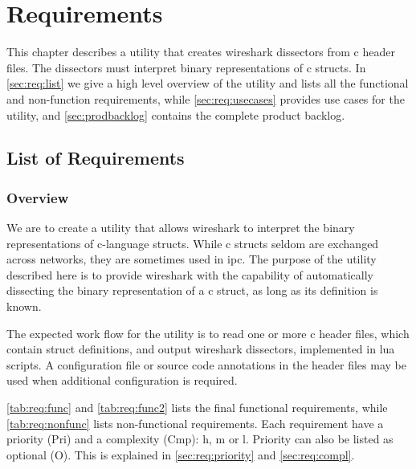 \chapter{Requirements}
\label{chap:req:requirements}
This chapter describes a \gls{utility} that creates \Gls{wireshark} \glspl{dissector} from \Gls{c}
\gls{header} files. The \glspl{dissector} must interpret \gls{binary} representations of \Gls{c}
\glspl{struct}. In \autoref{sec:req:list} we give a high level overview of the
\gls{utility} and lists all the functional and non-function requirements, 
while \autoref{sec:req:usecases} provides use cases for the \gls{utility}, 
and \autoref{sec:prodbacklog} contains the complete product backlog.

\section{List of Requirements}
\label{sec:req:list}

\subsection{Overview}
We are to create a \gls{utility} that allows \Gls{wireshark} to interpret the \gls{binary}
representations of \Gls{c}-language \glspl{struct}. While \Gls{c} \glspl{struct} seldom are exchanged
across networks, they are sometimes used in \gls{ipc}. The
purpose of the \gls{utility} described here is to provide \Gls{wireshark} with the
capability of automatically dissecting the \gls{binary} representation of a \Gls{c} \gls{struct},
as long as its definition is known.

The expected work flow for the \gls{utility} is to read one or more \Gls{c} \gls{header} files,
which contain \gls{struct} definitions, and output \Gls{wireshark} \glspl{dissector}, implemented
in \Gls{lua} scripts. A configuration file or source code annotations in the \gls{header}
files may be used when additional configuration is required.

\autoref{tab:req:func} and \autoref{tab:req:func2} lists the final functional requirements,
while \autoref{tab:req:nonfunc} lists non-functional requirements.
Each requirement have a priority (Pri) and a complexity (Cmp): \Gls{h}, 
\Gls{m} or \Gls{l}. Priority can also be listed as optional (O). This is
explained in \autoref{sec:req:priority} and \autoref{sec:req:compl}.

